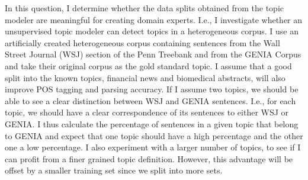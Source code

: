 In this question, I determine whether the data splits obtained from the topic modeler are meaningful for creating domain experts. I.e., I investigate whether an unsupervised topic modeler can detect topics in a heterogeneous corpus. I use an artificially created heterogeneous corpus containing sentences from the Wall Street Journal (WSJ) section of the Penn Treebank \citep{marcus:kim:ea:94} and  from the GENIA Corpus \citep{tateisi:tsujii:04} and take their original corpus as the gold standard topic. I assume that a good split into the known topics, financial news and biomedical abstracts, will also improve POS tagging and parsing accuracy. 
If I assume two topics, we should be able to see a clear distinction between WSJ and GENIA sentences. I.e., for each topic, we should have a clear correspondence of its sentences to either WSJ or GENIA. I thus calculate the percentage of sentences in a given topic that belong to GENIA and expect that one topic should have a high percentage and the other one a low percentage. I also experiment with a larger number of topics, to see if I can profit from a finer grained topic definition. However, this advantage will be offset by a smaller training set since we split into more sets. 





